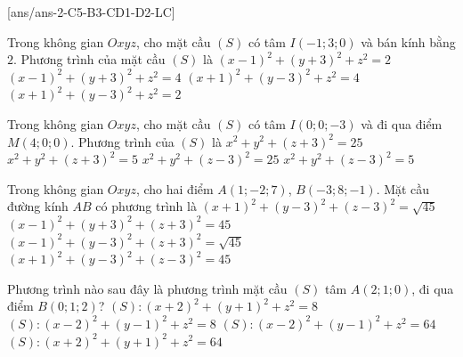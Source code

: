 \TN
{}[ans/ans-2-C5-B3-CD1-D2-LC]
\begin{ex}%
Trong không gian $Oxyz$, cho mặt cầu $(S)$ có tâm $I(-1;3;0)$ và bán kính bằng $2$. Phương trình của mặt cầu $(S)$ là
\choice
{$(x-1)^2+(y+3)^2+z^2=2$}
{$(x-1)^2+(y+3)^2+z^2=4$}
{\True $(x+1)^2+(y-3)^2+z^2=4$}
{$(x+1)^2+(y-3)^2+z^2=2$}
\end{ex}

\begin{ex}%
Trong không gian $Oxyz$, cho mặt cầu $(S)$ có tâm $I(0;0;-3)$ và đi qua điểm $M(4;0;0)$. Phương trình của $(S)$ là
\choice
{\True $x^2+y^2+(z+3)^2=25$}
{$x^2+y^2+(z+3)^2=5$}
{$x^2+y^2+(z-3)^2=25$}
{$x^2+y^2+(z-3)^2=5$}
\end{ex}

\begin{ex}%
Trong không gian $Oxyz$, cho hai điểm $A(1;-2;7)$, $B(-3;8;-1)$. Mặt cầu đường kính $AB$ có phương trình là
\choice
{$(x+1)^2+(y-3)^2+(z-3)^2=\sqrt{45}$}
{$(x-1)^2+(y+3)^2+(z+3)^2=45$}
{$(x-1)^2+(y-3)^2+(z+3)^2=\sqrt{45}$}
{\True $(x+1)^2+(y-3)^2+(z-3)^2=45$}
\end{ex}

\begin{ex}%
Phương trình nào sau đây là phương trình mặt cầu $(S)$ tâm $A(2;1;0)$, đi qua điểm $B(0;1;2)$?
\choice
{$(S)\colon{(x+2)^2}+(y+1)^2+z^2=8$}
{\True $(S)\colon{(x-2)^2}+(y-1)^2+z^2=8$}
{$(S)\colon{(x-2)^2}+(y-1)^2+z^2=64$}
{$(S)\colon{(x+2)^2}+(y+1)^2+z^2=64$}
\end{ex}

